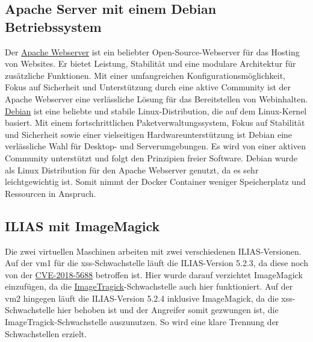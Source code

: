 \documentclass[10pt, a4paper,onecolumn ,titlepage]{article}
\begin{document}
    \subsection{Apache Server mit einem Debian Betriebssystem}
    \label{subsec:apacheServer}
    Der \href{https://httpd.apache.org/}{Apache Webserver} ist ein beliebter Open-Source-Webserver für das Hosting von Websites.
    Er bietet Leistung, Stabilität und eine modulare Architektur für zusätzliche Funktionen.
    Mit einer umfangreichen Konfigurationsmöglichkeit, Fokus auf Sicherheit und Unterstützung durch eine aktive Community ist der Apache Webserver eine verlässliche Lösung für das Bereitstellen von Webinhalten.
    \href{https://www.debian.org/}{Debian} ist eine beliebte und stabile Linux-Distribution, die auf dem Linux-Kernel basiert.
    Mit einem fortschrittlichen Paketverwaltungssystem, Fokus auf Stabilität und Sicherheit sowie einer vielseitigen Hardwareunterstützung ist Debian eine verlässliche Wahl für Desktop- und Serverumgebungen.
    Es wird von einer aktiven Community unterstützt und folgt den Prinzipien freier Software.
    Debian wurde als Linux Distribution für den Apache Webserver genutzt, da es sehr leichtgewichtig ist.
    Somit nimmt der Docker Container weniger Speicherplatz und Ressourcen in Anspruch.

    \subsection{ILIAS mit ImageMagick}
    \label{subsec:iliasTechnologie}
    Die zwei virtuellen Maschinen arbeiten mit zwei verschiedenen ILIAS-Versionen.
    Auf der \ac{vm}1 für die \ac{xss}-Schwachstelle läuft die ILIAS-Version 5.2.3, da diese noch von der \hyperref[subsubsec:CVE-2018-5688]{CVE-2018-5688} betroffen ist.
    Hier wurde darauf verzichtet ImageMagick einzufügen, da die \hyperref[subsubsec:CVE-2016-3714]{ImageTragick}-Schwachstelle auch hier funktioniert.
    Auf der \ac{vm}2 hingegen läuft die ILIAS-Version 5.2.4 inklusive ImageMagick, da die \ac{xss}-Schwachstelle hier behoben ist und der Angreifer somit gezwungen ist, die ImageTragick-Schwachstelle auszunutzen.
    So wird eine klare Trennung der Schwachstellen erzielt.
\end{document}
